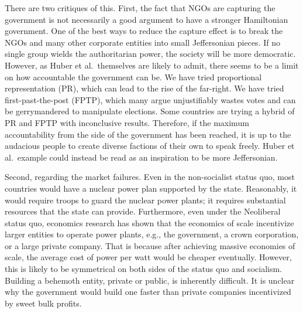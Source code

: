 \documentclass[12pt]{article}
\begin{document}
There are two critiques of this. First, the fact that NGOs are capturing the government is not necessarily a good argument to have a stronger Hamiltonian government. One of the best ways to reduce the capture effect is to break the NGOs and many other corporate entities into small Jeffersonian pieces. If no single group wields the authoritarian power, the society will be more democratic. However, as Huber et al.\ themselves are likely to admit, there seems to be a limit on how accountable the government can be. We have tried proportional representation (PR), which can lead to the rise of the far-right. We have tried first-past-the-post (FPTP), which many argue unjustifiably wastes votes and can be gerrymandered to manipulate elections. Some countries are trying a hybrid of PR and FPTP with inconclusive results. Therefore, if the maximum accountability from the side of the government has been reached, it is up to the audacious people to create diverse factions of their own to speak freely. Huber et al.\ example could instead be read as an inspiration to be more Jeffersonian.

Second, regarding the market failures. Even in the non-socialist status quo, most countries would have a nuclear power plan supported by the state. Reasonably, it would require troops to guard the nuclear power plants; it requires substantial resources that the state can provide. Furthermore, even under the Neoliberal status quo, economics research has shown that the economics of scale incentivize larger entities to operate power plants, e.g., the government, a crown corporation, or a large private company. That is because after achieving massive economies of scale, the average cost of power per watt would be cheaper eventually. However, this is likely to be symmetrical on both sides of the status quo and socialism. Building a behemoth entity, private or public, is inherently difficult. It is unclear why the government would build one faster than private companies incentivized by sweet bulk profits.
\end{document}
